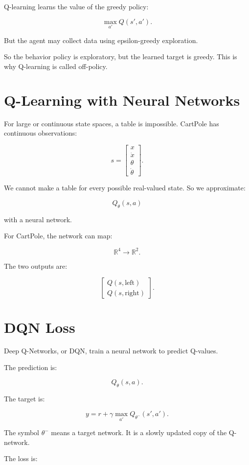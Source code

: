 \documentclass[11pt]{article}
\begin{document}
Q-learning learns the value of the greedy policy:

\[
\max_{a'} Q(s',a').
\]

But the agent may collect data using epsilon-greedy exploration.

So the behavior policy is exploratory, but the learned target is greedy.
This is why Q-learning is called off-policy.

\section{Q-Learning with Neural Networks}

For large or continuous state spaces, a table is impossible.
CartPole has continuous observations:

\[
s =
\begin{bmatrix}
x \\
\dot{x} \\
\theta \\
\dot{\theta}
\end{bmatrix}.
\]

We cannot make a table for every possible real-valued state.
So we approximate:

\[
Q_\theta(s,a)
\]

with a neural network.

For CartPole, the network can map:

\[
\mathbb{R}^4 \rightarrow \mathbb{R}^2.
\]

The two outputs are:

\[
\begin{bmatrix}
Q(s,\text{left}) \\
Q(s,\text{right})
\end{bmatrix}.
\]

\section{DQN Loss}

Deep Q-Networks, or DQN, train a neural network to predict Q-values.

The prediction is:

\[
Q_\theta(s,a).
\]

The target is:

\[
y
=
r + \gamma \max_{a'}Q_{\theta^-}(s',a').
\]

The symbol $\theta^-$ means a target network.
It is a slowly updated copy of the Q-network.

The loss is:
\end{document}
